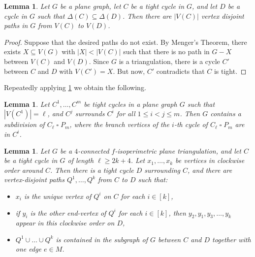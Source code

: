 \documentclass[a4paper,11pt]{article}
\theoremstyle{plain}
\newtheorem{lem}[thm]{Lemma}
\theoremstyle{definition}
\newcommand{\CartProd}{\mathbin{\square}}
\renewcommand{\geq}{\geqslant}
\renewcommand{\leq}{\leqslant}
\begin{document}
\begin{lem} \label{claim:tightcycle}
Let $G$ be a plane graph, let $C$ be a tight cycle in $G$, and let $D$ be a cycle in $G$ such that $\Delta(C) \subseteq \Delta(D)$. Then there are $|V(C)|$ vertex disjoint paths in $G$ from $V(C)$ to $V(D)$.
\end{lem}

\begin{proof}
Suppose that the desired paths do not exist. By Menger's Theorem, there exists $X \subseteq V(G)$ with $|X| < |V(C)|$ such that there is no path in $G-X$ between $V(C)$ and $V(D)$.  Since $G$ is a triangulation, there is a cycle $C'$ between $C$ and $D$ with $V(C')=X$.  But now, $C'$ contradicts that $C$ is tight.  
\end{proof}

Repeatedly applying \cref{claim:tightcycle} we obtain the following.

\begin{lem} \label{claim:cylindricalgrid}
Let $C^1, \dots, C^m$ be tight cycles in a plane graph $G$ such that $|V(C^1)|=\ell$, and $C^j$ surrounds $C^i$ for all $1 \leq i < j \leq m$. Then $G$ contains a subdivision of $C_\ell \CartProd P_m$, where the branch vertices of the $i$-th cycle of $C_\ell \CartProd P_m$ are in $C^i$.
\end{lem}

\begin{lem} \label{claim:switchpaths}
Let $G$ be a $4$-connected $f$-isoperimetric plane triangulation, and let $C$ be a tight cycle in $G$ of length $\ell \geq 2k+4$. Let $x_1, \dots, x_k$ be vertices in clockwise order around $C$.  Then there is a tight cycle $D$ surrounding $C$, and there are vertex-disjoint paths $Q^1, \dots, Q^k$ from $C$ to $D$ such that:
\begin{itemize}
    \item $x_i$ is the unique vertex of $Q^i$ on $C$ for each $i \in [k]$,
    \item if $y_i$ is the other end-vertex of $Q^i$ for each $i\in[k]$, then $y_2, y_1, y_3, \dots, y_k$
    appear in this clockwise order on $D$,
    \item $Q^1 \cup \dots \cup Q^k$ is contained in the subgraph of $G$ between $C$ and $D$ together with one edge $e \in M$.
\end{itemize}
\end{lem}
\end{document}
